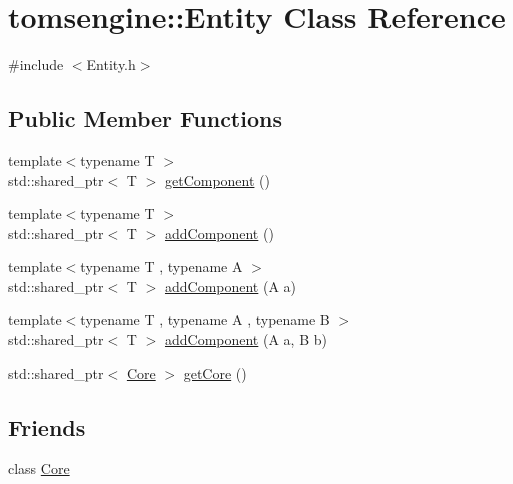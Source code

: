 \hypertarget{classtomsengine_1_1_entity}{}\section{tomsengine\+:\+:Entity Class Reference}
\label{classtomsengine_1_1_entity}


{\ttfamily \#include $<$Entity.\+h$>$}

\subsection*{Public Member Functions}
\begin{DoxyCompactItemize}
\item 
{\footnotesize template$<$typename T $>$ }\\std\+::shared\+\_\+ptr$<$ T $>$ \mbox{\hyperlink{classtomsengine_1_1_entity_ae21b5f4ee9d7b14e435c4e30158b31df}{get\+Component}} ()
\item 
{\footnotesize template$<$typename T $>$ }\\std\+::shared\+\_\+ptr$<$ T $>$ \mbox{\hyperlink{classtomsengine_1_1_entity_a1c7c295c7f130c529eaf606afa89500f}{add\+Component}} ()
\item 
{\footnotesize template$<$typename T , typename A $>$ }\\std\+::shared\+\_\+ptr$<$ T $>$ \mbox{\hyperlink{classtomsengine_1_1_entity_a6ac73653eb2a82ff00c799a3c2601cbd}{add\+Component}} (A a)
\item 
{\footnotesize template$<$typename T , typename A , typename B $>$ }\\std\+::shared\+\_\+ptr$<$ T $>$ \mbox{\hyperlink{classtomsengine_1_1_entity_a08a1874557bd871a4cd7484034b4196d}{add\+Component}} (A a, B b)
\item 
std\+::shared\+\_\+ptr$<$ \mbox{\hyperlink{classtomsengine_1_1_core}{Core}} $>$ \mbox{\hyperlink{classtomsengine_1_1_entity_a240e4cb523713f94bc26cfd965e9ddcf}{get\+Core}} ()
\end{DoxyCompactItemize}
\subsection*{Friends}
\begin{DoxyCompactItemize}
\item 
class \mbox{\hyperlink{classtomsengine_1_1_entity_a4107254ac74f90d4f91e810d755b98c2}{Core}}
\end{DoxyCompactItemize}


